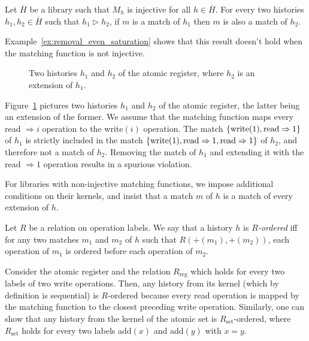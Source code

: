 \begin{lemma}
  \label{lem:match_extension1}

  Let $\overline{H}$ be a library such that $M_h$ is injective for all $h\in
  \overline{H}$. For every two histories $h_1, h_2\in \overline{H}$ such that
  $h_1 \vartriangleright h_2$, if $m$ is a match of $h_1$ then $m$ is also a
  match of $h_2$.

\end{lemma}

Example~\ref{ex:removal_even_saturation} shows that this result doesn't hold
when the matching function is not injective.

\begin{figure}

  

  \caption{Two histories $h_1$ and $h_2$ of the atomic register, where $h_2$ is
  an extension of $h_1$.}
  \label{fig:removal_even_saturation}

\end{figure}

\begin{example}
  \label{ex:removal_even_saturation}

  Figure~\ref{fig:removal_even_saturation} pictures two histories $h_1$ and
  $h_2$ of the atomic register, the latter being an extension of the former. We
  assume that the matching function maps every read $\Rightarrow i$ operation to
  the write$(i)$ operation. The match ${\{  \text{write}(1),
  \text{read}\Rightarrow 1  \}}$ of $h_1$ is strictly included in the match ${\{ 
  \text{write}(1), \text{read}\Rightarrow 1, \text{read}\Rightarrow 1  \}}$ of
  $h_2$, and therefore not a match of $h_2$. Removing the match of $h_1$ and
  extending it with the read $\Rightarrow 1$ operation results in a spurious
  violation.

\end{example}

For libraries with non-injective matching functions, we impose additional
conditions on their kernels, and insist that a match $m$ of $h$ is a match of
every extension of $h$.

Let $R$ be a relation on operation labels. We say that a history $h$ is
\emph{$R$-ordered} iff for any two matches $m_1$ and $m_2$ of $h$ such that
$R(+(m_1), +(m_2))$, each operation of $m_1$ is ordered before each operation
of $m_2$.

Consider the atomic register and the relation $R_\mathrm{reg}$ which holds for
every two labels of two write operations. Then, any history from its kernel
(which by definition is sequential) is $R$-ordered because every read operation
is mapped by the matching function to the closest preceding write operation.
Similarly, one can show that any history from the kernel of the atomic set is
$R_\mathrm{set}$-ordered, where $R_\mathrm{set}$ holds for every two labels
add$(x)$ and add$(y)$ with $x = y$.


